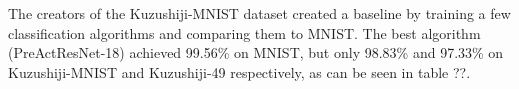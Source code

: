 The creators of the Kuzushiji-MNIST dataset created a baseline by training a few classification algorithms and comparing them to MNIST. The best algorithm (PreActResNet-18) achieved 99.56\% on MNIST, but only 98.83\% and 97.33\% on Kuzushiji-MNIST and Kuzushiji-49 respectively, as can be seen in table ??.
